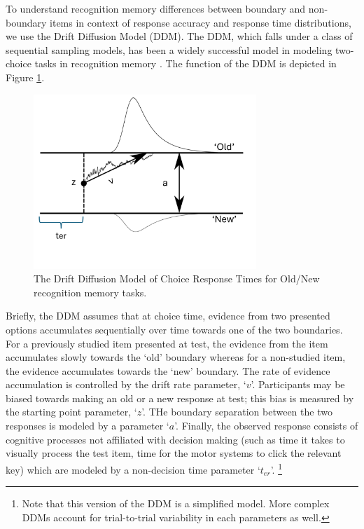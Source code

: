 To understand recognition memory differences between boundary and non-boundary items in context of response accuracy and response time distributions, we use the Drift Diffusion Model (DDM). The DDM, which falls under a class of sequential sampling models, has been a widely successful model in modeling two-choice tasks in recognition memory \cite{ratcliff2004diffusion, ratcliff2022discriminating, starns2014using, starns2014validating, ratcliff2009modeling}. The function of the DDM is depicted in Figure \ref{fig:ddm-model}. 

\begin{figure}[ht]
    \centering
    \includegraphics[width = 0.75\textwidth]{chapter_notebooks/chapter_3/figures/ddm.png}
    \caption{The Drift Diffusion Model of Choice Response Times for Old/New recognition memory tasks.}
    \label{fig:ddm-model}
\end{figure}

Briefly, the DDM assumes that at choice time, evidence from two presented options accumulates sequentially over time towards one of the two boundaries. For a previously studied item presented at test, the evidence from the item accumulates slowly towards the `old' boundary whereas for a non-studied item, the evidence accumulates towards the `new' boundary. The rate of evidence accumulation is controlled by the drift rate parameter, `$v$'. Participants may be biased towards making an old or a new response at test; this bias is measured by the starting point parameter, `$z$'. THe boundary separation between the two responses is modeled by a parameter `$a$'. Finally, the observed response consists of cognitive processes not affiliated with decision making (such as time it takes to visually process the test item, time for the motor systems to click the relevant key) which are modeled by a non-decision time parameter `$t_{er}$'. \footnote{Note that this version of the DDM is a simplified model. More complex DDMs account for trial-to-trial variability in each parameters as well.} 


